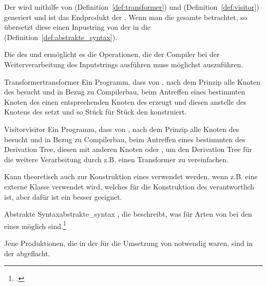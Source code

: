 Der  wird mithilfe von  (Definition~\ref{def:transformer}) und  (Definition~\ref{def:visitor}) generiert und ist das Endprodukt der . Wenn man die gesamte  betrachtet, so übersetzt diese einen Inpustring von der  in die  (Definition~\ref{def:abstrakte_syntax}).

Die  des  und   ermöglicht es die Operationen, die der Compiler bei der Weiterverarbeitung des Inputstrings ausführen muss möglichst  auszuführen.

\begin{Definition}{Transformer}{transformer}
Ein Programm, dass von , nach dem  Prinzip alle Knoten des  besucht und in Bezug zu Compilerbau, beim Antreffen eines bestimmten Knoten des  einen entsprechenden Knoten des  erzeugt und diesen anstelle des Knotens des  setzt und so Stück für Stück den  konstruiert.
\end{Definition}

\begin{Definition}{Visitor}{visitor}
Ein Programm, dass von , nach dem  Prinzip alle Knoten des  besucht und in Bezug zu Compilerbau, beim Antreffen eines bestimmten  des Derivation Tree, diesen  mit anderen Knoten  oder , um den Derivation Tree für die weitere Verarbeitung durch z.B. einen Transformer zu vereinfachen.

Kann theoretisch auch zur Konstruktion eines  verwendet werden, wenn z.B. eine externe Klasse verwendet wird, welches für die Konstruktion des  verantwortlich ist, aber dafür ist ein  besser geeignet.
\end{Definition}

\begin{Definition}{Abstrakte Syntax}{abstrakte_syntax}
  , die beschreibt, was für Arten von  bei den  eines  möglich sind.\footcite{noauthor_course_2022}

  Jene Produktionen, die in der  für die Umsetzung von  notwendig waren, sind in der  abgeflacht.
\end{Definition}


